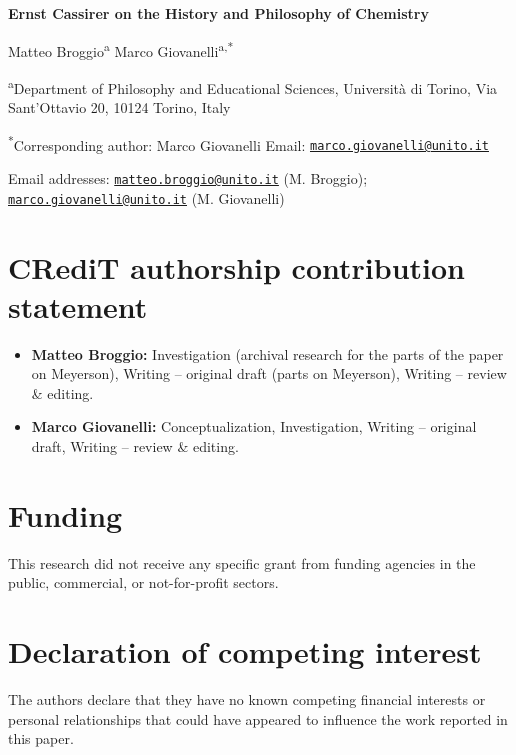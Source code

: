 \documentclass[12pt]{article}
\begin{document}
\thispagestyle{empty}

\begin{center}
{\Large\bfseries Ernst Cassirer on the History and Philosophy of Chemistry\par}
\vspace{1.5em}
{\large Matteo Broggio\textsuperscript{a} \quad Marco Giovanelli\textsuperscript{a,*}\par}
\end{center}

\vspace{1em}
\noindent\textsuperscript{a}Department of Philosophy and Educational Sciences, Università di Torino, Via Sant'Ottavio 20, 10124 Torino, Italy

\vspace{0.5em}
\noindent\textsuperscript{*}Corresponding author: Marco Giovanelli Email: \href{mailto:marco.giovanelli@unito.it}{\texttt{marco.giovanelli@unito.it}}

\vspace{0.5em}
\noindent Email addresses: \href{mailto:matteo.broggio@unito.it}{\texttt{matteo.broggio@unito.it}} (M. Broggio); \href{mailto:marco.giovanelli@unito.it}{\texttt{marco.giovanelli@unito.it}} (M. Giovanelli)

\section*{CRediT authorship contribution statement}


\begin{itemize}
\item \noindent\textbf{Matteo Broggio:} Investigation (archival research for the parts of the paper on Meyerson), Writing -- original draft (parts on Meyerson), Writing -- review \& editing.

\item \textbf{Marco Giovanelli:} Conceptualization, Investigation, Writing -- original draft, Writing -- review \& editing.
\end{itemize}


%

\section*{Funding}

This research did not receive any specific grant from funding agencies in the public, commercial, or not-for-profit sectors.

\section*{Declaration of competing interest}

The authors declare that they have no known competing financial interests or personal relationships that could have appeared to influence the work reported in this paper.
\end{document}
